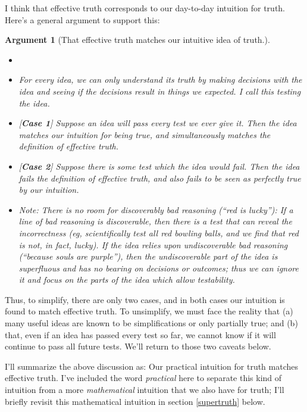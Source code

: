 \documentclass[11pt, oneside]{article}   	%
\newenvironment{answer}[1]
  {\renewcommand\theinnercustomthm{#1}\innercustomthm}
  {\endinnercustomthm}
\newtheorem{argt}{Argument}
\begin{document}
I think that effective truth corresponds to our day-to-day intuition for truth.
Here's a general argument to support this:
\begin{argt}[That effective truth matches our intuitive idea of truth.]
    \label{a1}
    \normalfont
\begin{itemize}
    \item[]
    \item For every idea, we can only understand its truth by making decisions
        with the idea and seeing if the decisions result in things we expected.
        I call this {\em testing the idea.}
    \item{} [{\bf Case 1}]
        Suppose an idea will pass every test we ever give it. Then
        the idea
        matches our intuition for being true, and simultaneously matches the
        definition of effective truth.
    \item{} [{\bf Case 2}]
        Suppose there is some test which the idea would fail.
        Then the idea fails the definition of
        effective truth, and also fails to be seen as perfectly true by our
        intuition.
    \item{}
        {\em Note:} There is no room for discoverably
        bad reasoning (``red is lucky''):
        If a line of bad reasoning is discoverable,
        then there is a test that can reveal the incorrectness
        (eg, scientifically test all red bowling balls, and we find that red is
        not, in fact, lucky).
        If the idea
        relies upon undiscoverable bad reasoning (``because souls are purple''),
        then the undiscoverable part of the idea is superfluous and has no
        bearing on decisions or outcomes; thus we can ignore it and focus on the
        parts of the idea which allow testability.
\end{itemize}
\end{argt}
Thus, to simplify, there are only two cases, and in both cases our intuition is
found to match effective truth. To unsimplify, we must face the reality that (a)
many useful ideas are known to be simplifications or only partially true; and
(b) that, even if an idea has passed every test so far, we cannot know if it
will continue to pass all future tests.
We'll return to those two caveats below.

I'll summarize the above discussion as:
\begin{answer}{3b.}
    Our practical intuition for truth matches effective truth.
\end{answer}
I've included the word {\em practical} here to separate this kind of intuition
from a more {\em mathematical} intuition that we also have for truth;
I'll briefly revisit this mathematical intuition in section \ref{supertruth}
below.
\end{document}
